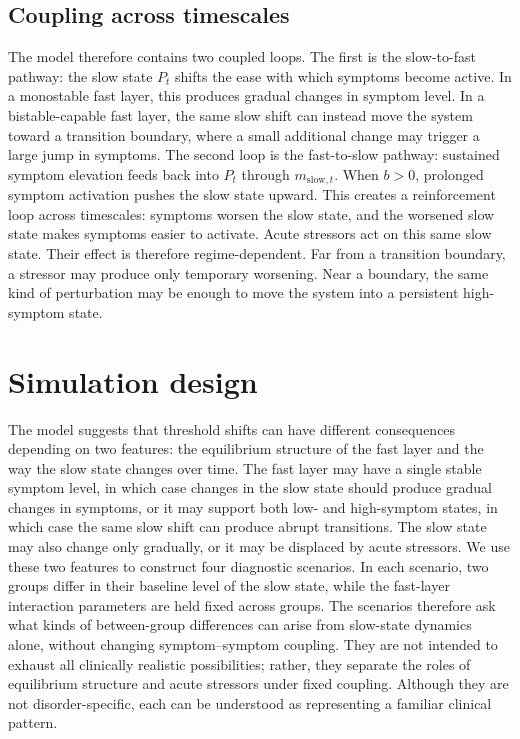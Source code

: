 \documentclass[man,12pt,floatsintext]{apa7}
\begin{document}
\subsection{Coupling across timescales}
The model therefore contains two coupled loops. The first is the slow-to-fast pathway: the slow state \(P_t\) shifts the ease with which symptoms become active. In a monostable fast layer, this produces gradual changes in symptom level. In a bistable-capable fast layer, the same slow shift can instead move the system toward a transition boundary, where a small additional change may trigger a large jump in symptoms.
The second loop is the fast-to-slow pathway: sustained symptom elevation feeds back into \(P_t\) through \(m_{\mathrm{slow},t}\). When \(b>0\), prolonged symptom activation pushes the slow state upward. This creates a reinforcement loop across timescales: symptoms worsen the slow state, and the worsened slow state makes symptoms easier to activate. Acute stressors act on this same slow state. Their effect is therefore regime-dependent. Far from a transition boundary, a stressor may produce only temporary worsening. Near a boundary, the same kind of perturbation may be enough to move the system into a persistent high-symptom state.
\section{Simulation design}\label{sec:simulation}
The model suggests that threshold shifts can have different consequences depending on two features: the equilibrium structure of the fast layer and the way the slow state changes over time. The fast layer may have a single stable symptom level, in which case changes in the slow state should produce gradual changes in symptoms, or it may support both low- and high-symptom states, in which case the same slow shift can produce abrupt transitions. The slow state may also change only gradually, or it may be displaced by acute stressors.
We use these two features to construct four diagnostic scenarios. In each scenario, two groups differ in their baseline level of the slow state, while the fast-layer interaction parameters are held fixed across groups. The scenarios therefore ask what kinds of between-group differences can arise from slow-state dynamics alone, without changing symptom--symptom coupling. They are not intended to exhaust all clinically realistic possibilities; rather, they separate the roles of equilibrium structure and acute stressors under fixed coupling. Although they are not disorder-specific, each can be understood as representing a familiar clinical pattern.
\end{document}
